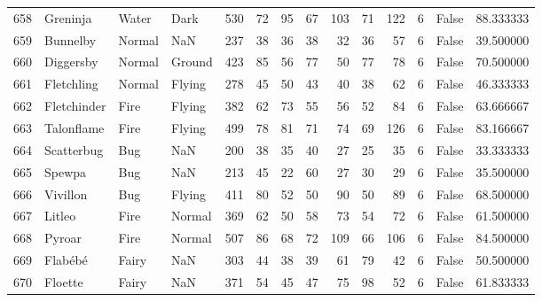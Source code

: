 \begin{tabular}{rlllrrrrrrrrlr}
 658 &                   Greninja &     Water &      Dark &    530 &   72 &      95 &       67 &      103 &       71 &    122 &           6 &      False &   88.333333 \\
 659 &                   Bunnelby &    Normal &       NaN &    237 &   38 &      36 &       38 &       32 &       36 &     57 &           6 &      False &   39.500000 \\
 660 &                  Diggersby &    Normal &    Ground &    423 &   85 &      56 &       77 &       50 &       77 &     78 &           6 &      False &   70.500000 \\
 661 &                 Fletchling &    Normal &    Flying &    278 &   45 &      50 &       43 &       40 &       38 &     62 &           6 &      False &   46.333333 \\
 662 &                Fletchinder &      Fire &    Flying &    382 &   62 &      73 &       55 &       56 &       52 &     84 &           6 &      False &   63.666667 \\
 663 &                 Talonflame &      Fire &    Flying &    499 &   78 &      81 &       71 &       74 &       69 &    126 &           6 &      False &   83.166667 \\
 664 &                 Scatterbug &       Bug &       NaN &    200 &   38 &      35 &       40 &       27 &       25 &     35 &           6 &      False &   33.333333 \\
 665 &                     Spewpa &       Bug &       NaN &    213 &   45 &      22 &       60 &       27 &       30 &     29 &           6 &      False &   35.500000 \\
 666 &                   Vivillon &       Bug &    Flying &    411 &   80 &      52 &       50 &       90 &       50 &     89 &           6 &      False &   68.500000 \\
 667 &                     Litleo &      Fire &    Normal &    369 &   62 &      50 &       58 &       73 &       54 &     72 &           6 &      False &   61.500000 \\
 668 &                     Pyroar &      Fire &    Normal &    507 &   86 &      68 &       72 &      109 &       66 &    106 &           6 &      False &   84.500000 \\
 669 &                    Flabébé &     Fairy &       NaN &    303 &   44 &      38 &       39 &       61 &       79 &     42 &           6 &      False &   50.500000 \\
 670 &                    Floette &     Fairy &       NaN &    371 &   54 &      45 &       47 &       75 &       98 &     52 &           6 &      False &   61.833333 \\

\end{tabular}
